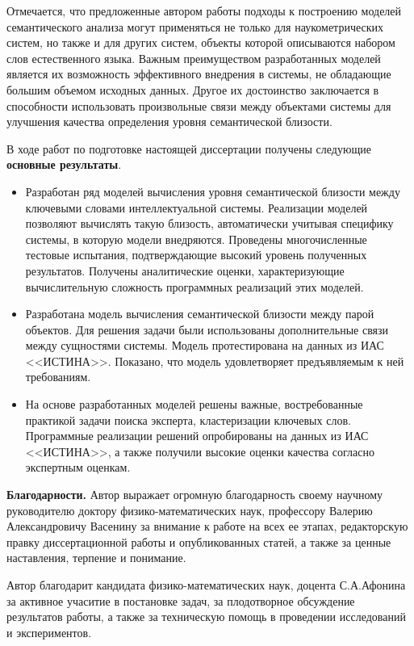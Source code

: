 Отмечается, что предложенные автором работы подходы к построению моделей семантического анализа могут применяться не только для наукометрических систем, но также и для других систем, объекты которой описываются набором слов естественного языка. Важным преимуществом разработанных моделей является их возможность эффективного внедрения в системы, не обладающие большим объемом исходных данных. Другое их достоинство заключается в способности использовать произвольные связи между объектами системы для улучшения качества определения уровня семантической близости.

В ходе работ по подготовке настоящей диссертации получены следующие \textbf{основные результаты}.
\begin{itemize}
    \item Разработан ряд моделей вычисления уровня семантической близости между ключевыми словами интеллектуальной системы. Реализации моделей позволяют вычислять такую близость, автоматически учитывая специфику системы, в которую модели внедряются. Проведены многочисленные тестовые испытания, подтверждающие высокий уровень полученных результатов. Получены аналитические оценки, характеризующие вычислительную сложность программных реализаций этих моделей.
    \item Разработана модель вычисления семантической близости между парой объектов. Для решения задачи были использованы дополнительные связи между сущностями системы. Модель протестирована на данных из ИАС <<ИСТИНА>>. Показано, что модель удовлетворяет предъявляемым к ней требованиям.
    \item На основе разработанных моделей решены важные, востребованные практикой задачи поиска эксперта, кластеризации ключевых слов. Программные реализации решений опробированы на данных из ИАС <<ИСТИНА>>, а также получили высокие оценки качества согласно экспертным оценкам.
\end{itemize}

\textbf{Благодарности.} Автор выражает огромную благодарность своему научному руководителю доктору физико-математических наук, профессору Валерию Александровичу Васенину за внимание к работе на всех ее этапах, редакторскую правку диссертационной работы и опубликованных статей, а также за ценные наставления, терпение и понимание.

Автор благодарит кандидата физико-математических наук, доцента С.А.Афонина за активное учаситие в постановке задач, за плодотворное обсуждение результатов работы, а также за техническую помощь в проведении исследований и экспериментов.





